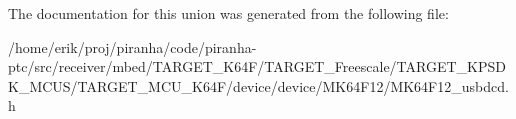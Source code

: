 The documentation for this union was generated from the following file\+:\begin{DoxyCompactItemize}
\item 
/home/erik/proj/piranha/code/piranha-\/ptc/src/receiver/mbed/\+T\+A\+R\+G\+E\+T\+\_\+\+K64\+F/\+T\+A\+R\+G\+E\+T\+\_\+\+Freescale/\+T\+A\+R\+G\+E\+T\+\_\+\+K\+P\+S\+D\+K\+\_\+\+M\+C\+U\+S/\+T\+A\+R\+G\+E\+T\+\_\+\+M\+C\+U\+\_\+\+K64\+F/device/device/\+M\+K64\+F12/M\+K64\+F12\+\_\+usbdcd.\+h\end{DoxyCompactItemize}
